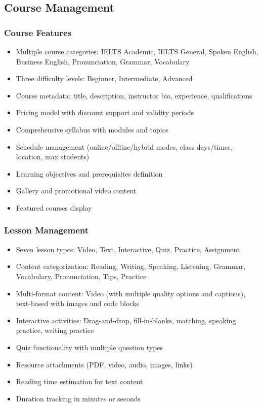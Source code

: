 \documentclass{article}
\begin{document}
\subsection{Course Management}

\subsubsection{Course Features}
\begin{itemize}
    \item Multiple course categories: IELTS Academic, IELTS General, Spoken English, Business English, Pronunciation, Grammar, Vocabulary
    \item Three difficulty levels: Beginner, Intermediate, Advanced
    \item Course metadata: title, description, instructor bio, experience, qualifications
    \item Pricing model with discount support and validity periods
    \item Comprehensive syllabus with modules and topics
    \item Schedule management (online/offline/hybrid modes, class days/times, location, max students)
    \item Learning objectives and prerequisites definition
    \item Gallery and promotional video content
    \item Featured courses display
\end{itemize}

\subsubsection{Lesson Management}
\begin{itemize}
    \item Seven lesson types: Video, Text, Interactive, Quiz, Practice, Assignment
    \item Content categorization: Reading, Writing, Speaking, Listening, Grammar, Vocabulary, Pronunciation, Tips, Practice
    \item Multi-format content: Video (with multiple quality options and captions), text-based with images and code blocks
    \item Interactive activities: Drag-and-drop, fill-in-blanks, matching, speaking practice, writing practice
    \item Quiz functionality with multiple question types
    \item Resource attachments (PDF, video, audio, images, links)
    \item Reading time estimation for text content
    \item Duration tracking in minutes or seconds
\end{itemize}
\end{document}
